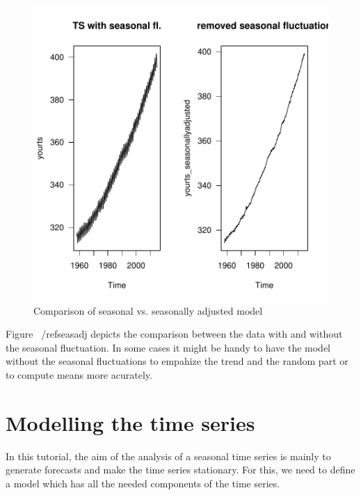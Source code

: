 \documentclass[11pt, a4paper]{article} %
\begin{document}
\begin{figure}[H]
\centering
\begin{Schunk}
\end{Schunk}
\includegraphics{alleselena-seasadj}
\caption{Comparison of seasonal vs. seasonally adjusted model}
\label{seasadj}
\end{figure}

\noindent Figure  ~/ref{seasadj} depicts the comparison between the data with and without the seasonal fluctuation. In some cases it might be handy to have the model without the seasonal fluctuations to empahize the trend and the random part or to compute means more acurately.  


\section{Modelling the time series}
In this tutorial, the aim of the analysis of a seasonal time series is mainly  to generate forecasts  and make the time series stationary. For this, we need to define a model which has all the needed components of the time series. 
\end{document}
